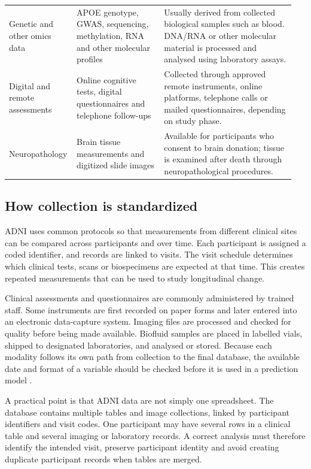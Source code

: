 \documentclass[11pt,a4paper]{article}
\begin{document}
\begin{longtable}{@{}>{\raggedright\arraybackslash}p{0.2\linewidth}>{\raggedright\arraybackslash}p{0.3\linewidth}>{\raggedright\arraybackslash}p{0.45\linewidth}@{}}
Genetic and other omics data & APOE genotype, GWAS, sequencing, methylation, RNA and other molecular profiles & Usually derived from collected biological samples such as blood. DNA/RNA or other molecular material is processed and analysed using laboratory assays.\\
Digital and remote assessments & Online cognitive tests, digital questionnaires and telephone follow-ups & Collected through approved remote instruments, online platforms, telephone calls or mailed questionnaires, depending on study phase.\\
Neuropathology & Brain tissue measurements and digitized slide images & Available for participants who consent to brain donation; tissue is examined after death through neuropathological procedures.\\
\end{longtable}\endgroup
\subsection{How collection is standardized}
ADNI uses common protocols so that measurements from different clinical sites can be compared across participants and over time. Each participant is assigned a coded identifier, and records are linked to visits. The visit schedule determines which clinical tests, scans or biospecimens are expected at that time. This creates repeated measurements that can be used to study longitudinal change.

Clinical assessments and questionnaires are commonly administered by trained staff. Some instruments are first recorded on paper forms and later entered into an electronic data-capture system. Imaging files are processed and checked for quality before being made available. Biofluid samples are placed in labelled vials, shipped to designated laboratories, and analysed or stored. Because each modality follows its own path from collection to the final database, the available date and format of a variable should be checked before it is used in a prediction model \cite{collection}.

A practical point is that ADNI data are not simply one spreadsheet. The database contains multiple tables and image collections, linked by participant identifiers and visit codes. One participant may have several rows in a clinical table and several imaging or laboratory records. A correct analysis must therefore identify the intended visit, preserve participant identity and avoid creating duplicate participant records when tables are merged.
\end{document}
